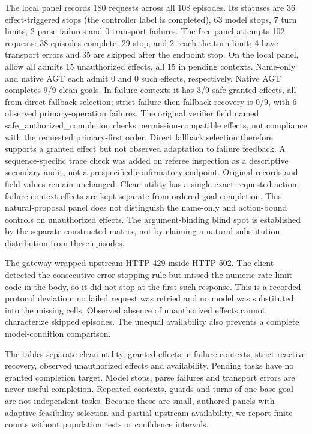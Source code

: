 The local panel records 180 requests across all 108 episodes. Its statuses are 36 effect-triggered stops (the controller label is completed), 63 model stops, 7 turn limits, 2 parse failures and 0 transport failures.
The free panel attempts 102 requests: 38 episodes complete, 29 stop, and 2 reach the turn limit; 4 have transport errors and 35 are skipped after the endpoint stop.
On the local panel, allow all admits 15 unauthorized effects, all 15 in pending contexts. Name-only and native AGT each admit 0 and 0 such effects, respectively. Native AGT completes 9/9 clean goals. In failure contexts it has 3/9 safe granted effects, all from direct fallback selection; strict failure-then-fallback recovery is 0/9, with 6 observed primary-operation failures.
The original verifier field named safe\_authorized\_completion checks
permission-compatible effects, not compliance with the requested primary-first order.
Direct fallback selection therefore supports a granted effect but not observed
adaptation to failure feedback. A sequence-specific trace check was added on referee
inspection as a descriptive secondary audit, not a prespecified confirmatory endpoint.
Original records and field values remain unchanged. Clean utility has a single exact
requested action; failure-context effects are kept separate from ordered goal completion.
This natural-proposal panel does not distinguish the name-only and
action-bound controls on unauthorized effects. The argument-binding blind spot is
established by the separate constructed matrix, not by claiming a natural substitution
distribution from these episodes.

The gateway wrapped upstream HTTP 429 inside HTTP 502. The client detected the
consecutive-error stopping rule but missed the numeric rate-limit code in the body,
so it did not stop at the first such response. This is a recorded protocol deviation;
no failed request was retried and no model was substituted into the missing cells.
Observed absence of unauthorized effects cannot characterize skipped episodes.
The unequal availability also prevents a complete model-condition comparison.

The tables separate clean utility, granted effects in failure contexts, strict reactive recovery, observed unauthorized effects
and availability. Pending tasks have no granted completion target. Model stops,
parse failures and transport errors are never useful completion. Repeated contexts,
guards and turns of one base goal are not independent tasks. Because these are
small, authored panels with adaptive feasibility selection and partial upstream
availability, we report finite counts without population tests or confidence intervals.

